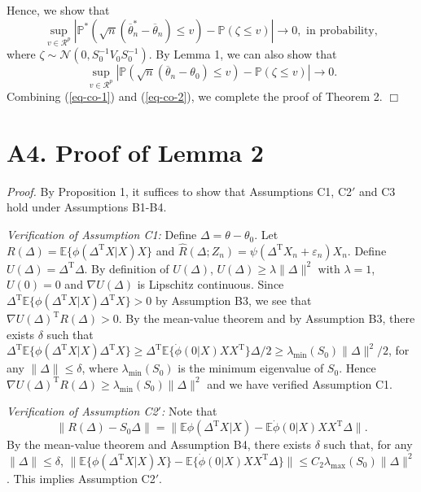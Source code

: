 \documentclass[twoside,11pt]{article}
\def\trans{^{ \mathrm{\scriptscriptstyle T} }}
\def\wh{\widehat}
\def\ol{\overline}
\begin{document}
Hence, we show that
\begin{equation}\label{eq-co-1}
\sup_{v\in\mathcal{R}^p}\left|\mathbb{P}^*\left(\sqrt{n}(\ol{\theta}^*_n-\ol{\theta}_n)\leq v\right)-\mathbb{P}(\zeta\leq v)\right| \rightarrow 0, {\mbox{\ in\ probability}},
\end{equation}
where $\zeta\sim\mathcal{N}(0, S_0^{-1}V_0S_0^{-1})$. By Lemma 1, we can also show that
\begin{equation}\label{eq-co-2}
\sup_{v\in\mathcal{R}^p}\left|\mathbb{P}\left(\sqrt{n}(\ol{\theta}_n-\theta_0)\leq v\right)-\mathbb{P}(\zeta\leq v)\right| \rightarrow 0.
\end{equation}
Combining (\ref{eq-co-1}) and (\ref{eq-co-2}), we complete the proof of Theorem 2. $\Box$\\

\section*{A4. Proof of Lemma 2}

{\it Proof.} By Proposition 1, it suffices to show that Assumptions C1, C2$'$ and C3 hold under Assumptions B1-B4.

{\it Verification of Assumption C1:} Define $\Delta=\theta-\theta_0$. Let $R(\Delta)=\mathbb{E}\{\phi(\Delta\trans X|X)X\}$ and $\wh{R}(\Delta; Z_n)=\psi(\Delta\trans X_n+\varepsilon_n)X_n$. Define $U(\Delta)=\Delta\trans\Delta$. By definition of $U(\Delta)$, $U(\Delta)\geq \lambda \|\Delta\|^2$ with $\lambda=1$, $U(0)=0$ and $\nabla U(\Delta)$ is Lipschitz continuous. Since $\Delta\trans\mathbb{E}\{\phi(\Delta\trans X|X)\Delta\trans X\}>0$ by Assumption B3, we see that $\nabla U(\Delta)\trans R(\Delta)>0$. By the mean-value theorem and by Assumption B3, there exists $\delta$ such that $\Delta\trans\mathbb{E}\{\phi(\Delta\trans X|X)\Delta\trans X\}\geq\Delta\trans\mathbb{E}\{\dot{\phi}(0|X) XX\trans\}\Delta/2\geq \lambda_{\min}(S_0)\|\Delta\|^2/2$, for any $\|\Delta\|\leq \delta$, where $\lambda_{\min}(S_0)$ is the minimum eigenvalue of $S_0$. Hence $\nabla U(\Delta)\trans R(\Delta)\geq \lambda_{\min}(S_0)\|\Delta\|^2$ and we have verified Assumption C1.


{\it Verification of Assumption C2$'$:} Note that $$
\|R(\Delta)-S_0\Delta\|=\|\mathbb{E}\phi(\Delta\trans X|X)-\mathbb{E}\dot{\phi}(0|X)XX\trans\Delta\|.$$ By the mean-value theorem and Assumption B4, there exists $\delta$ such that, for any $\|\Delta\|\leq \delta$, $\|\mathbb{E}\{\phi(\Delta\trans X|X)X\}-\mathbb{E}\{\dot{\phi}(0|X)XX\trans\Delta\}\|\leq C_2\lambda_{\max}(S_0)\|\Delta\|^2$. This implies Assumption C2$'$.
\end{document}
